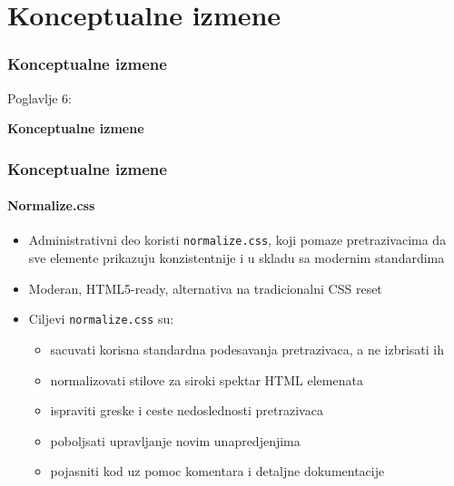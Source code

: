 %

\section{Konceptualne izmene}
\begin{frame}[fragile]
	\frametitle{Konceptualne izmene}

	\begin{center}\huge{Poglavlje 6:}\end{center}
	\begin{center}\huge{\color{typo3darkgrey}\textbf{Konceptualne izmene}}\end{center}

\end{frame}


\begin{frame}[fragile]
	\frametitle{Konceptualne izmene}
	\framesubtitle{Normalize.css}

	\begin{itemize}
		\item Administrativni deo koristi \texttt{normalize.css},\newline
			koji pomaze pretrazivacima da sve elemente prikazuju konzistentnije i u skladu sa modernim standardima
		\item Moderan, HTML5-ready, alternativa na tradicionalni CSS reset
		\item Ciljevi \texttt{normalize.css} su:

			\begin{itemize}
				\item sacuvati korisna standardna podesavanja pretrazivaca, a ne izbrisati ih
				\item normalizovati stilove za siroki spektar HTML elemenata
				\item ispraviti greske i ceste nedoslednosti pretrazivaca
				\item poboljsati upravljanje novim unapredjenjima
				\item pojasniti kod uz pomoc komentara i detaljne dokumentacije
			\end{itemize}

	\end{itemize}

\end{frame}


